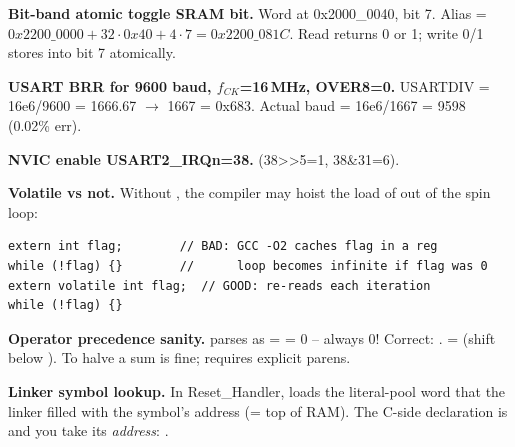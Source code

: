 \begin{ex}\textbf{Bit-band atomic toggle SRAM bit.} Word at 0x2000\_0040, bit 7. Alias = $0x2200\_0000 + 32 \cdot 0x40 + 4 \cdot 7 = 0x2200\_081C$. Read returns 0 or 1; write 0/1 stores into bit 7 atomically.\end{ex}

\begin{ex}\textbf{USART BRR for 9600 baud, $f_{CK}$=16\,MHz, OVER8=0.} USARTDIV = 16e6/9600 = 1666.67 $\to$ 1667 = 0x683. Actual baud = 16e6/1667 = 9598 (0.02\% err).\end{ex}

\begin{ex}\textbf{NVIC enable USART2\_IRQn=38.}  (38>>5=1, 38\&31=6).\end{ex}

\begin{ex}\textbf{Volatile vs not.} Without , the compiler may hoist the load of  out of the spin loop:
\begin{lstlisting}[language={}]
extern int flag;        // BAD: GCC -O2 caches flag in a reg
while (!flag) {}        //      loop becomes infinite if flag was 0
extern volatile int flag;  // GOOD: re-reads each iteration
while (!flag) {}
\end{lstlisting}\end{ex}

\begin{ex}\textbf{Operator precedence sanity.}
 parses as  =  = 0 -- always 0!
Correct: .
 =  (shift below \cee{+}). To halve a sum is fine;  requires explicit parens.\end{ex}

\begin{ex}\textbf{Linker symbol lookup.} In Reset\_Handler,  loads the literal-pool word that the linker filled with the symbol's address (= top of RAM). The C-side declaration is  and you take its \emph{address}: .\end{ex}
